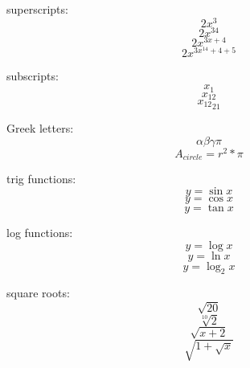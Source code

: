 \documentclass[11]{article}
\begin{document}
superscripts: 
$$ 2x^3 $$ %
$$ 2x^{34} $$ %
$$ 2x^{ 3x + 4} $$
$$ 2x^{ 3x^{14} + 4 + 5} $$ %

subscripts: 
$$ x_1 $$
$$ x_{12} $$
$$ {x_{12}}_{21} $$ %

Greek letters: 
$$ \alpha \beta \gamma \pi $$ %
$$ A_{circle} = r^2 * \pi $$

trig functions: 
$$ y = \sin{x} $$
$$ y = \cos{x} $$
$$ y = \tan{x} $$

log functions: 
$$ y = \log{x} $$
$$ y = \ln{x} $$
$$ y = \log_2{x} $$ %

square roots: 
$$ \sqrt{20} $$
$$ \sqrt[10]{2} $$
$$ \sqrt{x + 2} $$
$$ \sqrt{1 + \sqrt{x}} $$ %
\end{document}
